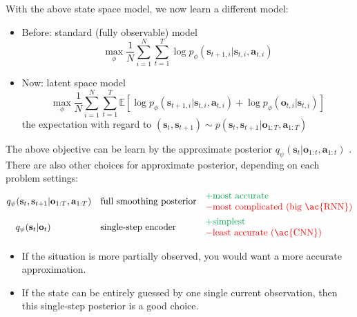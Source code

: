 With the above state space model, we now learn a different model:
\begin{itemize}
	\item Before: standard (fully observable) model
	\[ \underset{\phi}{\max} \frac{1}{N} \sum_{i=1}^N \sum_{t=1}^T \log p_\phi (\textbf{s}_{t+1, i} | \textbf{s}_{t, i}, \textbf{a}_{t,i}) \]
	\item Now: latent space model
	\[ \underset{\phi}{\max} \frac{1}{N} \sum_{i=1}^N \sum_{t=1}^T \mathbb{E}\left[ \log p_\phi (\textbf{s}_{t+1, i} | \textbf{s}_{t, i}, \textbf{a}_{t,i}) + \log p_\phi(\textbf{o}_{t,i}|\textbf{s}_{t, i}) \right] \]
	the expectation with regard to $(\textbf{s}_t, \textbf{s}_{t+1})\sim p(\textbf{s}_t, \textbf{s}_{t+1} | \textbf{o}_{1:T}, \textbf{a}_{1:T})$ 
\end{itemize}

The above objective can be learn by the approximate posterior $q_\psi(\textbf{s}_t | \textbf{o}_{1:t}, \textbf{a}_{1:t})$ . There are also other choices for approximate posterior, depending on each problem settings:
\begin{align*}
	&q_\psi(\textbf{s}_t, \textbf{s}_{t+1} | \textbf{o}_{1:T}, \textbf{a}_{1:T}) &&\text{full smoothing posterior} &&\begin{matrix*}[l]
		\color{Green}+ \text{most accurate}\\
		\color{red}- \text{most complicated (big \ac{RNN})}
	\end{matrix*}\\
	&\quad q_\psi(\textbf{s}_t | \textbf{o}_t) &&\text{single-step encoder} &&\begin{matrix*}[l]
		\color{Green}+ \text{simplest}\\
		\color{red}- \text{least accurate (\ac{CNN})}
	\end{matrix*}
\end{align*}
\begin{itemize}
	\item If the situation is more partially observed, you would want a more accurate approximation.
	\item If the state can be entirely guessed by one single current observation, then this single-step posterior is a good choice.
\end{itemize}

